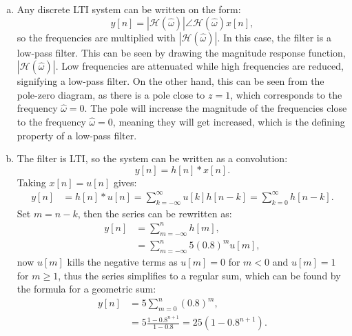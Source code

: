 \begin{enumerate}
\begin{enumerate}[a)]
              \item Any discrete LTI system can be written on the form:
                    \[y[n]=|\mathcal{H}(\hat{\omega})|\angle\mathcal{H}(\hat{\omega}) x[n],\]
                    so the frequencies are multiplied with $|\mathcal{H}(\hat{\omega})|$.
                    In this case, the filter is a low-pass filter.
                    This can be seen by drawing the magnitude response function, $|\mathcal{H}(\hat{\omega})|$.
                    Low frequencies are attenuated while high frequencies are reduced, signifying a low-pass filter.
                    On the other hand, this can be seen from the pole-zero diagram, as there is a pole close to $z = 1$,
                    which corresponds to the frequency $\hat{\omega} = 0$. The pole will increase the magnitude of the
                    frequencies close to the frequency $\hat{\omega} = 0$, meaning they will get increased, which is the
                    defining property of a low-pass filter.

              \item The filter is LTI, so the system can be written as a convolution:
                    \[y[n] = h[n]*x[n].\]
                    Taking $x[n] = u[n]$ gives:
                    \begin{align*}
                        y[n] & = h[n]*u[n] = \sum_{k=-\infty}^{\infty}u[k]h[n-k] = \sum_{k=0}^{\infty}h[n-k].
                    \end{align*}
                    Set $m = n-k$, then the series can be rewritten as:
                    \begin{align*}
                        y[n] & = \sum_{m=-\infty}^{n}h[m],           \\
                             & = \sum_{m=-\infty}^{n}5(0.8)^{m}u[m],
                    \end{align*}
                    now $u[m]$ kills the negative terms as $u[m]=0$ for $m<0$ and $u[m]=1$ for $m\ge 1$,
                    thus the series simplifies to a regular sum, which can be found by the formula for a geometric sum:
                    \begin{align*}
                        y[n] & = 5\sum_{m=0}^{n}(0.8)^{m},                           \\
                             & = 5\frac{1 - 0.8^{n+1}}{1 - 0.8} = 25(1 - 0.8^{n+1}).
                    \end{align*}
          \end{enumerate}


\end{enumerate}

